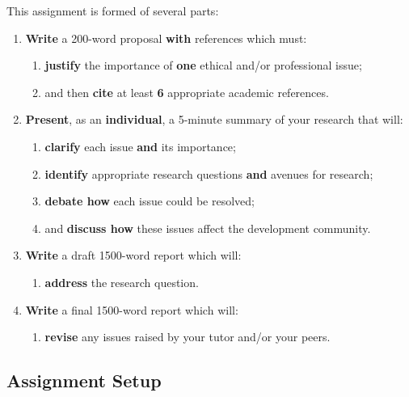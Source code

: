 \documentclass{../../fal_assignment}
\newcommand{\proposalWordCount}{200}
\newcommand{\essayWordCount}{1500}
\newcommand{\presentationMinutes}{5}
\newcommand{\minReferenceCount}{6}
\begin{document}
This assignment is formed of several parts:

\begin{enumerate}[label=(\Alph*)]
    \item \textbf{Write} a \proposalWordCount-word proposal \textbf{with} references which must:
    	\begin{enumerate}[label=\roman*.]
    		\item \textbf{justify} the importance of \textbf{one} ethical and/or professional issue;
    		\item and then \textbf{cite} at least \textbf{\minReferenceCount} appropriate academic references.
	\end{enumerate}
    \item \textbf{Present}, as an \textbf{individual}, a \presentationMinutes-minute summary of your research that will:
    	\begin{enumerate}[label=\roman*.]
    		\item \textbf{clarify} each issue \textbf{and} its importance;
    		\item \textbf{identify} appropriate research questions \textbf{and} avenues for research;
    		\item \textbf{debate how} each issue could be resolved;
    		\item and \textbf{discuss how} these issues affect the development community.
	\end{enumerate}
    \item \textbf{Write} a draft \essayWordCount-word report which will:
    	\begin{enumerate}[label=\roman*.]
    		\item  \textbf{address} the research question.
	\end{enumerate}
    \item \textbf{Write} a final \essayWordCount-word report which will:
    	\begin{enumerate}[label=\roman*.]
    		\item \textbf{revise} any issues raised by your tutor and/or your peers.
	\end{enumerate}
\end{enumerate}


\subsection*{Assignment Setup}
\end{document}
